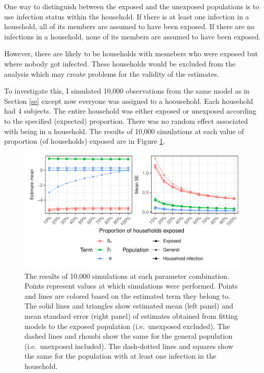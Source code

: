 \documentclass[
]{article}
\begin{document}
One way to distinguish between the exposed and the unexposed populations is to use infection status within the household. If there is at least one infection in a household, all of its members are assumed to have been exposed. If there are no infections in a household, none of its members are assumed to have been exposed.

However, there are likely to be households with memebers who were exposed but where nobody got infected. These households would be excluded from the analysis which may create problems for the validity of the estimates.

To investigate this, I simulated 10,000 observations from the same model as in Section \ref{se} except now everyone was assigned to a hoousehold. Each household had 4 subjects. The entire household was either exposed or unexposed according to the specified (expected) proportion. There was no random effect associated with being in a household. The results of 10,000 simulations at each value of proportion (of households) exposed are in Figure \ref{fig:plot3}.



\begin{figure}

{\centering \includegraphics{sim-plot/plot3} 

}

\caption{The results of 10,000 simulations at each parameter combination. Points represent values at which simulations were performed. Points and lines are colored based on the estimated term they belong to. The solid lines and triangles show estimated mean (left panel) and mean standard error (right panel) of estimates obtained from fitting models to the exposed population (i.e.~unexposed excluded). The dashed lines and rhombi show the same for the general population (i.e.~unexposed included). The dash-dotted lines and squares show the same for the population with at least one infection in the household.}\label{fig:plot3}
\end{figure}
\end{document}
